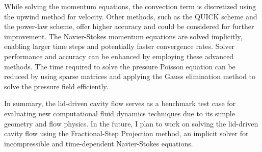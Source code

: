 \documentclass{article}
\numberwithin{equation}{section}
\numberwithin{figure}{section}
\begin{document}
While solving the momentum equations, the convection term is discretized using the upwind method for velocity. Other methods, such as the QUICK scheme and the power-law scheme, offer higher accuracy and could be considered for further improvement. The Navier-Stokes momentum equations are solved implicitly, enabling larger time steps and potentially faster convergence rates. Solver performance and accuracy can be enhanced by employing these advanced methods. The time required to solve the pressure Poisson equation can be reduced by using sparse matrices and applying the Gauss elimination method to solve the pressure field efficiently. 

In summary, the lid-driven cavity flow serves as a benchmark test case for evaluating new computational fluid dynamics techniques due to its simple geometry and flow physics. In the future, I plan to work on solving the lid-driven cavity flow using the Fractional-Step Projection method, an implicit solver for incompressible and time-dependent Navier-Stokes equations.
\end{document}
